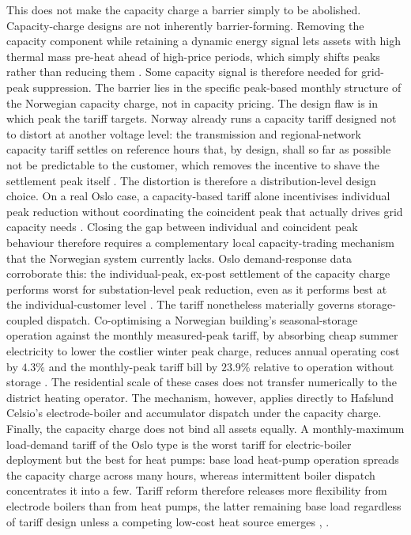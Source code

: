 This does not make the capacity charge a barrier simply to be abolished. Capacity-charge designs are not inherently barrier-forming. Removing the capacity component while retaining a dynamic energy signal lets assets with high thermal mass pre-heat ahead of high-price periods, which simply shifts peaks rather than reducing them \cite{wilczynski_assessment_2023}. Some capacity signal is therefore needed for grid-peak suppression. The barrier lies in the specific peak-based monthly structure of the Norwegian capacity charge, not in capacity pricing. The design flaw is in which peak the tariff targets. Norway already runs a capacity tariff designed not to distort at another voltage level: the transmission and regional-network capacity tariff settles on reference hours that, by design, shall so far as possible not be predictable to the customer, which removes the incentive to shave the settlement peak itself \cite{rme_nettleie_2025}. The distortion is therefore a distribution-level design choice. On a real Oslo case, a capacity-based tariff alone incentivises individual peak reduction without coordinating the coincident peak that actually drives grid capacity needs \cite{askeland_activating_2021}. Closing the gap between individual and coincident peak behaviour therefore requires a complementary local capacity-trading mechanism that the Norwegian system currently lacks. Oslo demand-response data corroborate this: the individual-peak, ex-post settlement of the capacity charge performs worst for substation-level peak reduction, even as it performs best at the individual-customer level \cite{hofmann_grid_2025}. The tariff nonetheless materially governs storage-coupled dispatch. Co-optimising a Norwegian building's seasonal-storage operation against the monthly measured-peak tariff, by absorbing cheap summer electricity to lower the costlier winter peak charge, reduces annual operating cost by $4.3\%$ and the monthly-peak tariff bill by $23.9\%$ relative to operation without storage \cite{thorvaldsen_long-term_2024}. The residential scale of these cases does not transfer numerically to the district heating operator. The mechanism, however, applies directly to Hafslund Celsio's electrode-boiler and accumulator dispatch under the capacity charge. Finally, the capacity charge does not bind all assets equally. A monthly-maximum load-demand tariff of the Oslo type is the worst tariff for electric-boiler deployment but the best for heat pumps: base load heat-pump operation spreads the capacity charge across many hours, whereas intermittent boiler dispatch concentrates it into a few. Tariff reform therefore releases more flexibility from electrode boilers than from heat pumps, the latter remaining base load regardless of tariff design unless a competing low-cost heat source emerges \cite{sandberg_energy_2019}, \cite{johannsen_incentivising_2021}.

